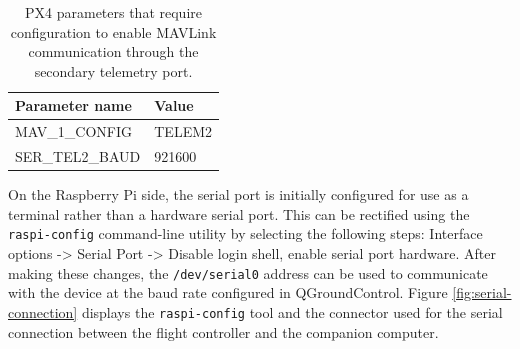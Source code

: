 \begin{table}[h!]
 \begin{center}
  \begin{tabular}{l|l}
    Parameter name & Value \\ \hline
    MAV\_1\_CONFIG & TELEM2 \\
    SER\_TEL2\_BAUD & 921600 \\
  \end{tabular}
  \caption{PX4 parameters that require configuration to enable MAVLink communication through the secondary telemetry port.}
  \label{tab:telem2-params}
 \end{center}
\end{table}



On the Raspberry Pi side, the serial port is initially configured for use as a terminal rather than a hardware serial port. This can be rectified using the \texttt{raspi-config} command-line utility by selecting the following steps: Interface options -> Serial Port -> Disable login shell, enable serial port hardware. After making these changes, the \texttt{/dev/serial0} address can be used to communicate with the device at the baud rate configured in QGroundControl. Figure \ref{fig:serial-connection} displays the \texttt{raspi-config} tool and the connector used for the serial connection between the flight controller and the companion computer.


